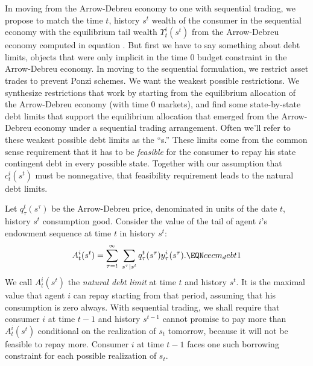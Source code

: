 In moving from  the Arrow-Debreu economy to one with sequential
trading, we propose to  match  the time $t$, history $s^{t}$ wealth of
the consumer  in the sequential economy with the equilibrium  tail wealth
$\Upsilon^i_t(s^t)$ from the Arrow-Debreu economy computed in equation
. But first we have to say something about debt
limits, objects that were  only implicit in the time $0$ budget constraint  in the Arrow-Debreu economy.
In moving to the sequential formulation, we    restrict asset trades to prevent Ponzi schemes.  We
want the weakest possible restrictions.  We
synthesize restrictions that work by starting from the equilibrium
allocation of the Arrow-Debreu economy (with time $0$ markets), and
find some state-by-state debt limits that support
the equilibrium allocation that emerged from the Arrow-Debreu economy under a sequential trading arrangement.
 Often we'll refer to these weakest possible
debt limits as the ``s.'' These limits come
from the common sense requirement that it has to be {\it
feasible\/} for the consumer to repay his state contingent debt in
every possible state.
Together with  our assumption that $c_t^i(s^t)$ must be nonnegative, that
feasibility requirement leads to the natural debt limits.




Let $q_\tau^t(s^\tau)$ be the Arrow-Debreu price, denominated  in
units of the date $t$, history
 $s^t$  consumption good.
Consider the value of the tail of  agent $i$'s endowment sequence
at time $t$ in history $s^t$:
$$ A^i_t(s^t) =
   \sum_{\tau=t}^\infty \; \sum_{s^\tau \vert s^t}
    q^t_\tau(s^\tau) y_\tau^i(s^\tau).   \EQN cecm_debt1$$
 We call
$A^i_t(s^t)$ the {\it natural debt limit} at time $t$ and history
$s^t$. It is the  maximal value that agent $i$   can
repay starting from that period, assuming that his consumption is
zero always.
With sequential trading, we shall require that consumer $i$ at time $t-1$ and
history $s^{t-1}$ cannot promise to pay more than $A^i_t(s^t)$
conditional on the realization of $s_t$ tomorrow, because it will
not be feasible to repay more. Consumer $i$ at
time $t-1$ faces one such borrowing constraint for each possible
realization of $s_t$.


